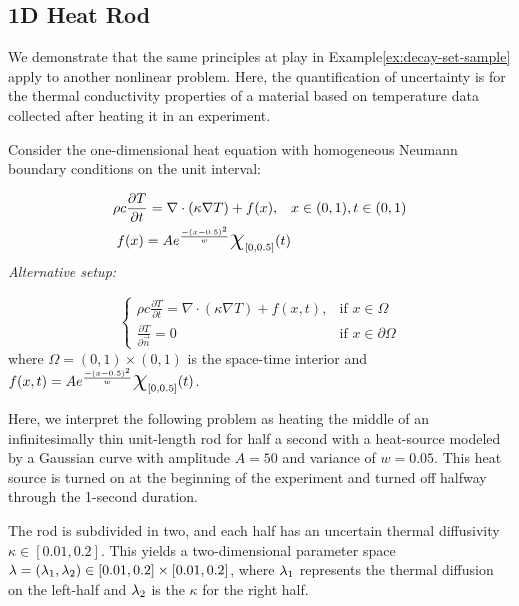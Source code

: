 \subsection{1D Heat Rod}\label{ex:heat-set-sample}

We demonstrate that the same principles at play in Example\ref{ex:decay-set-sample} apply to another nonlinear problem.
Here, the quantification of uncertainty is for the thermal conductivity properties of a material based on temperature data collected after heating it in an experiment.


Consider the one-dimensional heat equation with homogeneous Neumann boundary conditions on the unit interval:

\begin{equation}
\begin{split}
\rho c \frac{\partial T}{\partial t} = \nabla \cdot ( \kappa \nabla T) + f(x), \quad & x\in (0,1), t\in (0,1) \\
f(x) = A e^\frac{- (x-0.5)^2}{w} \Chi_{[0,0.5]}(t)
\end{split}
\end{equation}
\emph{Alternative setup: }

\begin{equation}
\begin{cases}
\rho c \frac{\partial T}{\partial t} = \nabla \cdot ( \kappa \nabla T) + f(x,t), & \text{if } x\in \Omega \\
\frac{\partial T}{\partial \vec{n}} = 0 & \text{if } x\in \partial \Omega
\end{cases}
\end{equation}
where $\Omega = (0,1)\times (0,1)$ is the space-time interior and $f(x,t) = A e^\frac{- (x-0.5)^2}{w} \Chi_{[0,0.5]}(t)$.

Here, we interpret the following problem as heating the middle of an infinitesimally thin unit-length rod for half a second with a heat-source modeled by a Gaussian curve with amplitude $A=50$ and variance of $w=0.05$.
This heat source is turned on at the beginning of the experiment and turned off halfway through the 1-second duration.

The rod is subdivided in two, and each half has an uncertain thermal diffusivity $\kappa \in [0.01, 0.2]$.
This yields a two-dimensional parameter space $\lambda = (\lambda_1, \lambda_2) \in [0.01, 0.2]\times [0.01, 0.2]$, where $\lambda_1$ represents the thermal diffusion on the left-half and $\lambda_2$ is the $\kappa$ for the right half.

